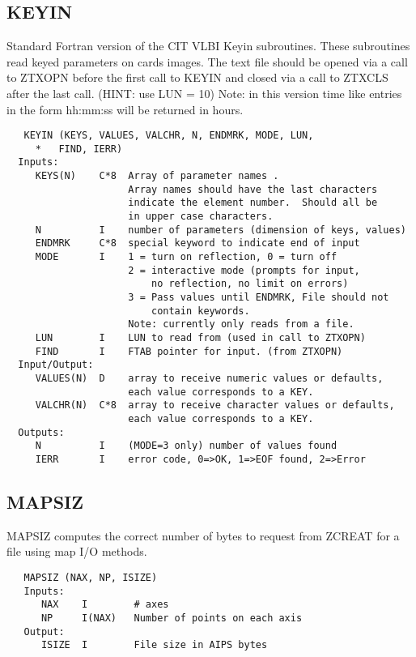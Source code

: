 \subsection{KEYIN}
Standard Fortran version of the CIT VLBI Keyin subroutines.
These subroutines read keyed parameters on cards images.
The text file should be opened via a call to ZTXOPN before the
first call to KEYIN and closed via a call to ZTXCLS after the last
call.  (HINT: use LUN = 10)
Note: in this version time like entries in the form hh:mm:ss
will be returned in hours.
\begin{verbatim}
   KEYIN (KEYS, VALUES, VALCHR, N, ENDMRK, MODE, LUN,
     *   FIND, IERR)
  Inputs:
     KEYS(N)    C*8  Array of parameter names .
                     Array names should have the last characters
                     indicate the element number.  Should all be
                     in upper case characters.
     N          I    number of parameters (dimension of keys, values)
     ENDMRK     C*8  special keyword to indicate end of input
     MODE       I    1 = turn on reflection, 0 = turn off
                     2 = interactive mode (prompts for input,
                         no reflection, no limit on errors)
                     3 = Pass values until ENDMRK, File should not
                         contain keywords.
                     Note: currently only reads from a file.
     LUN        I    LUN to read from (used in call to ZTXOPN)
     FIND       I    FTAB pointer for input. (from ZTXOPN)
  Input/Output:
     VALUES(N)  D    array to receive numeric values or defaults,
                     each value corresponds to a KEY.
     VALCHR(N)  C*8  array to receive character values or defaults,
                     each value corresponds to a KEY.
  Outputs:
     N          I    (MODE=3 only) number of values found
     IERR       I    error code, 0=>OK, 1=>EOF found, 2=>Error
\end{verbatim}

\subsection{MAPSIZ}
MAPSIZ computes the correct number of bytes to request from ZCREAT
for a file using map I/O methods.
\begin{verbatim}
   MAPSIZ (NAX, NP, ISIZE)
   Inputs:
      NAX    I        # axes
      NP     I(NAX)   Number of points on each axis
   Output:
      ISIZE  I        File size in AIPS bytes
\end{verbatim}

